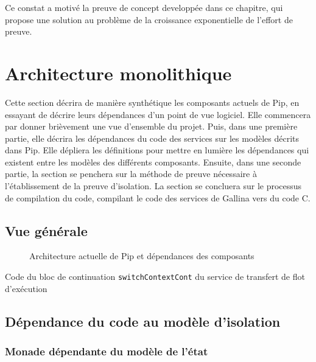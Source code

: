 	Ce constat a motivé la preuve de concept developpée dans ce chapitre, qui propose une solution au problème de la croissance exponentielle de l'effort de preuve.

	\section{Architecture monolithique}

		Cette section décrira de manière synthétique les composants actuels de Pip, en essayant de décrire leurs dépendances d'un point de vue logiciel. Elle commencera par donner brièvement une vue d'ensemble du projet. Puis, dans une première partie, elle décrira les dépendances du code des services sur les modèles décrits dans Pip. Elle dépliera les définitions pour mettre en lumière les dépendances qui existent entre les modèles des différents composants. Ensuite, dans une seconde partie, la section se penchera sur la méthode de preuve nécessaire à l'établissement de la preuve d'isolation. La section se concluera sur le processus de compilation du code, compilant le code des services de Gallina vers du code C.
		
		\subsection{Vue générale}

			\begin{figure}[!ht]
				
				\caption{Architecture actuelle de Pip et dépendances des composants}
				\label{fig:currentPipArchitecture}
			\end{figure}
			\begin{listing}[!ht]
				\caption{Code du bloc de continuation \texttt{switchContextCont} du service de transfert de flot d'exécution}
				\label{code:switchContextCont}
			\end{listing}

		\subsection{Dépendance du code au modèle d'isolation}

			\subsubsection{Monade dépendante du modèle de l'état}

